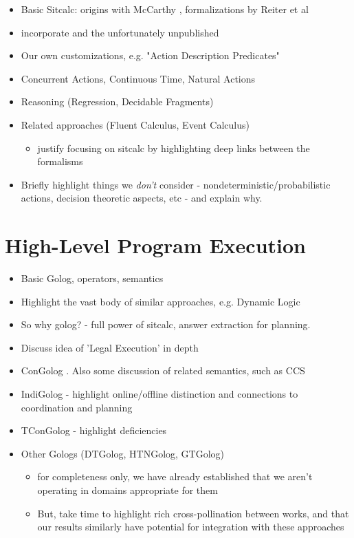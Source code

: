 \begin{itemize}
\item Basic Sitcalc: origins with McCarthy \cite{McCHay69sitcalc}, formalizations by Reiter et al \cite{reiter01kia,pirri99contributions_sitcalc,levesque98sc_foundations}
\item incorporate \cite{pinto99ramification,pinto98interacting_effects} and the unfortunately unpublished \cite{pinto00action_interaction}
\item Our own customizations, e.g. "Action Description Predicates" \cite{kelly07sc_persistence}
\item Concurrent Actions, Continuous Time, Natural Actions \cite{pinto94temporal,reiter96sc_nat_conc}
\item Reasoning (Regression, Decidable Fragments)
\item Related approaches (Fluent Calculus, Event Calculus)
  \begin{itemize}
  \item justify focusing on sitcalc by highlighting deep links between the formalisms
  \end{itemize}
\item Briefly highlight things we \emph{don't} consider - nondeterministic/probabilistic actions, decision theoretic aspects, etc - and explain why.
\end{itemize}

\section{High-Level Program Execution}

\begin{itemize}
\item Basic Golog, operators, semantics \cite{levesque97golog}
\item Highlight the vast body of similar approaches, e.g. Dynamic Logic
\item So why golog? - full power of sitcalc, answer extraction for planning.
\item Discuss idea of 'Legal Execution' in depth
\item ConGolog \cite{giacomo00congolog}.  Also some discussion of related
semantics, such as CCS 
\item IndiGolog - highlight online/offline distinction and connections to coordination and planning \cite{giacomo99indigolog}
\item TConGolog - highlight deficiencies \cite{pinto99tcongolog}
\item Other Gologs (DTGolog, HTNGolog, GTGolog)
  \begin{itemize}
  \item for completeness only, we have already established that we aren't operating in domains appropriate for them
  \item But, take time to highlight rich cross-pollination between works, and that our results similarly have potential for integration with these approaches
  \end{itemize}
\end{itemize}

